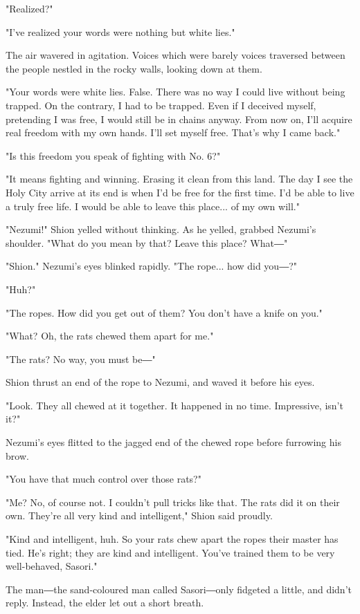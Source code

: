 "Realized?"

"I've realized your words were nothing but white lies."

The air wavered in agitation. Voices which were barely voices traversed
between the people nestled in the rocky walls, looking down at them.

"Your words were white lies. False. There was no way I could live
without being trapped. On the contrary, I had to be trapped. Even if I
deceived myself, pretending I was free, I would still be in chains
anyway. From now on, I'll acquire real freedom with my own hands. I'll
set myself free. That's why I came back."

"Is this freedom you speak of fighting with No. 6?"

"It means fighting and winning. Erasing it clean from this land. The day
I see the Holy City arrive at its end is when I'd be free for the first
time. I'd be able to live a truly free life. I would be able to leave
this place... of my own will."

"Nezumi!" Shion yelled without thinking. As he yelled, grabbed Nezumi's
shoulder. "What do you mean by that? Leave this place? What―"

"Shion." Nezumi's eyes blinked rapidly. "The rope... how did you―?"

"Huh?"

"The ropes. How did you get out of them? You don't have a knife on you."

"What? Oh, the rats chewed them apart for me."

"The rats? No way, you must be―"

Shion thrust an end of the rope to Nezumi, and waved it before his eyes.

"Look. They all chewed at it together. It happened in no time.
Impressive, isn't it?"

Nezumi's eyes flitted to the jagged end of the chewed rope before
furrowing his brow.

"You have that much control over those rats?"

"Me? No, of course not. I couldn't pull tricks like that. The rats did
it on their own. They're all very kind and intelligent," Shion said
proudly.

"Kind and intelligent, huh. So your rats chew apart the ropes their
master has tied. He's right; they are kind and intelligent. You've
trained them to be very well-behaved, Sasori."

The man―the sand-coloured man called Sasori―only fidgeted a little, and
didn't reply. Instead, the elder let out a short breath.

